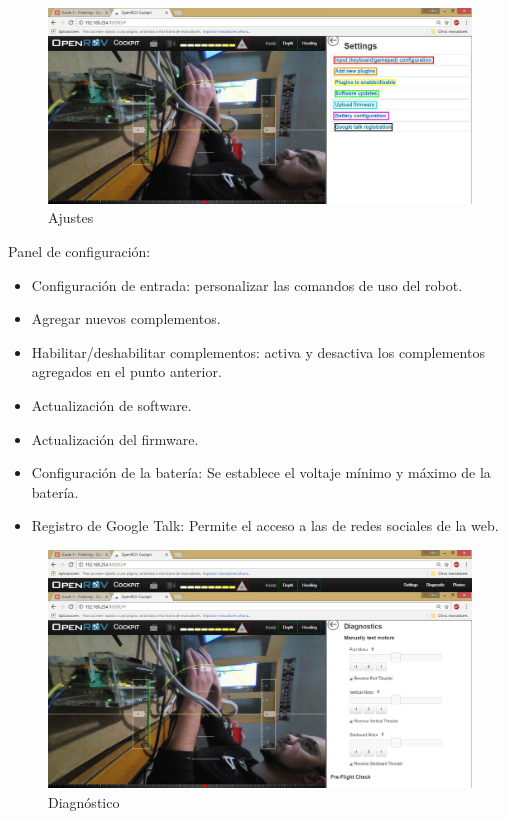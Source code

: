 \begin{figure} [hbtp]
\begin{center}
  \includegraphics[width=15cm]{img/cap3/3_5/setting}
\end{center}
\caption{Ajustes}
\label{fig:settting}
\end{figure}
\newpage
Panel de configuración:
\begin{itemize}
 \item[\textcolor{red}{\textbullet}] Configuración de entrada: personalizar las comandos de uso del robot.
 \item[\textcolor{orange}{\textbullet}] Agregar nuevos complementos.
 \item[\textcolor{yellow}{\textbullet}] Habilitar/deshabilitar complementos: activa y desactiva los complementos agregados en el punto anterior.
 \item[\textcolor{green}{\textbullet}] Actualización de software.
 \item[\textcolor{blue}{\textbullet}] Actualización del firmware.
 \item[\textcolor{purple}{\textbullet}] Configuración de la batería: Se establece el voltaje mínimo y máximo de la batería.
 \item[\textcolor{black}{\textbullet}] Registro de Google Talk: Permite el acceso a las de redes sociales de la web.
 \end{itemize}

\begin{figure} [hbtp]
\begin{center}
  \includegraphics[width=15cm]{img/cap3/3_5/diagnostico}
\end{center}
\caption{Diagnóstico}
\label{fig:diagnostico}
\end{figure}

